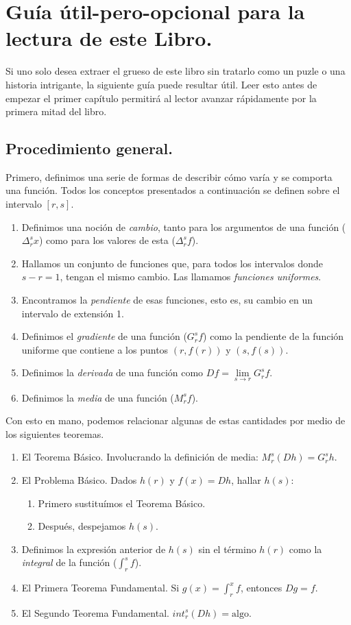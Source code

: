 \section{Guía útil-pero-opcional para la lectura de este Libro.}

Si uno solo desea extraer el grueso de este libro sin tratarlo como un puzle o una historia intrigante, la siguiente guía puede resultar útil. Leer esto antes de empezar el primer capítulo permitirá al lector avanzar rápidamente por la primera mitad del libro.

\subsection{Procedimiento general.}

Primero, definimos una serie de formas de describir cómo varía y se comporta una función. Todos los conceptos presentados a continuación se definen sobre el intervalo $[r, s]$.

\begin{enumerate}
	\item Definimos una noción de \textit{cambio}, tanto para los argumentos de una función ($\Delta_r^s x$) como para los valores de esta ($\Delta_r^s f$).
	\item Hallamos un conjunto de funciones que, para todos los intervalos donde $s - r = 1$, tengan el mismo cambio. Las llamamos \textit{funciones uniformes}.
	\item Encontramos la \textit{pendiente} de esas funciones, esto es, su cambio en un intervalo de extensión 1.
	\item Definimos el \textit{gradiente} de una función ($G_r^s f$) como la pendiente de la función uniforme que contiene a los puntos $(r, f(r))$ y $(s, f(s))$.
	\item Definimos la \textit{derivada} de una función como $Df = \lim\limits_{s\to r} G_r^s f$.
	\item Definimos la \textit{media} de una función ($M_r^s f$).	
\end{enumerate}

Con esto en mano, podemos relacionar algunas de estas cantidades por medio de los siguientes teoremas.

\begin{enumerate}
	\item El Teorema Básico. Involucrando la definición de media: $M_r^s (Dh) = G_r^s h$.
	\item El Problema Básico. Dados $h(r)$ y $f(x) = Dh$, hallar $h(s)$:
		\begin{enumerate}
			\item Primero sustituímos el Teorema Básico.
			\item Después, despejamos $h(s)$.
		\end{enumerate}
	\item Definimos la expresión anterior de $h(s)$ sin el término $h(r)$ como la \textit{integral} de la función ($\int_r^s f$).
	\item El Primera Teorema Fundamental. Si $g(x) = \int_r^x f$, entonces $Dg = f$.
	\item El Segundo Teorema Fundamental. $int_r^s (Dh) = \textrm{algo}$.
\end{enumerate}

